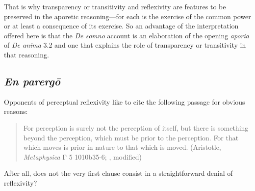 
That is why transparency or transitivity and reflexivity are features to be preserved in the aporetic reasoning—for each is the exercise of the common power or at least a consequence of its exercise. So an advantage of the interpretation offered here is that the \emph{De somno} account is an elaboration of the opening \emph{aporia} of \emph{De anima} 3.2 and one that explains the role of transparency or transitivity in that reasoning.

\subsection{\emph{En parergō}} %
\label{sub:_emph_en_parergo}

Opponents of perceptual reflexivity like to cite the following passage for obvious reasons:
\begin{quote}
 	For perception is surely not the perception of itself, but there is something beyond the perception, which must be prior to the perception. For that which moves is prior in nature to that which is moved. (Aristotle, \emph{Metaphysica} {\sbl Γ} 5 1010b35-6; \citealt{Ross:1928ir}, modified)
\end{quote}
After all, does not the very first clause consist in a straightforward denial of reflexivity? 

